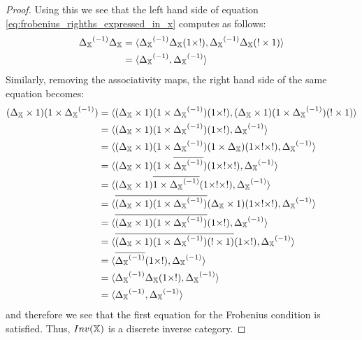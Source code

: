 \begin{proof}
  Using this we see that the left hand side of equation \vref{eq:frobenius_righths_expressed_in_x}
  computes as follows:
  \begin{align*}
    {\Delta_{\ensuremath{\mathbb{X}}}}^{(-1)} \Delta_{\mathbb{X}} 
      & = \langle{\Delta_{\ensuremath{\mathbb{X}}}}^{(-1)} \Delta_{\mathbb{X}}(1\times !), {\Delta_{\mathbb{X}}}^{(-1)} \Delta_{\mathbb{X}} (! \times 1)\rangle\\
    &= \langle{\Delta_{\ensuremath{\mathbb{X}}}}^{(-1)}, {\Delta_{\mathbb{X}}}^{(-1)} \rangle
  \end{align*}
  Similarly, removing the associativity maps, the right hand side of the same equation becomes:
  \begin{align*}
    (\Delta_{\X} \times 1) (1\times\inv{\Delta_{\X}}) &
      = \<(\Delta_{\X} \times 1) (1\times\inv{\Delta_{\X}}) (1\times !),
      (\Delta_{\X} \times 1) (1\times\inv{\Delta_{\X}}) (! \times 1 )\> \\
    &= \<(\Delta_{\X} \times 1) (1\times\inv{\Delta_{\X}}) (1\times ! ), \inv{\Delta_{\X}}\> \\
    &= \<(\Delta_{\X} \times 1) (1\times\inv{\Delta_{\X}}) (1 \times \Delta_{\X})(1\times !\times !), \inv{\Delta_{\X}}\> \\
    &= \<(\Delta_{\X} \times 1) (1\times\rst{\inv{\Delta_{\X}}}) (1\times !\times !), \inv{\Delta_{\X}}\> \\
    &= \<(\Delta_{\X} \times 1) \rst{1\times\inv{\Delta_{\X}}} (1\times !\times !), \inv{\Delta_{\X}}\> \\
    &= \<\rst{(\Delta_{\X} \times 1) (1\times\inv{\Delta_{\X}})} 
      (\Delta_{\X} \times 1)(1\times !\times !), \inv{\Delta_{\X}}\> \\ %
    &= \<\rst{(\Delta_{\X} \times 1) (1\times\inv{\Delta_{\X}})} (1\times !), \inv{\Delta_{\X}}\> \\
      &= \<\rst{(\Delta_{\X} \times 1) (1\times\inv{\Delta_{\X}})(! \times 1)} (1\times !),
      \inv{\Delta_{\X}}\> \\ %
    &= \<\rst{\inv{\Delta_{\X}}} (1\times !), \inv{\Delta_{\X}}\> \\
    &= \<\inv{\Delta_{\X}}\Delta_{\X}(1\times !), \inv{\Delta_{\X}}\> \\
    &= \<\inv{\Delta_{\X}}, \inv{\Delta_{\X}}\>
  \end{align*}
  and therefore we see that the first equation for the Frobenius condition is satisfied. Thus,
  $Inv(\mathbb{X})$ is a discrete inverse category.
\end{proof}

